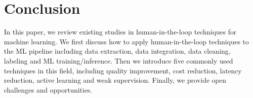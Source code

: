 
\section{Conclusion}
\label{sec:con}



In this paper,  we review existing studies in human-in-the-loop techniques for machine learning. We first discuss how to apply human-in-the-loop techniques to the ML pipeline including data extraction, data integration, data cleaning, labeling and ML training/inference. Then we introduce five commonly used techniques in this field, including quality improvement, cost reduction, latency reduction, active learning and weak supervision. Finally, we provide open challenges and opportunities. 

